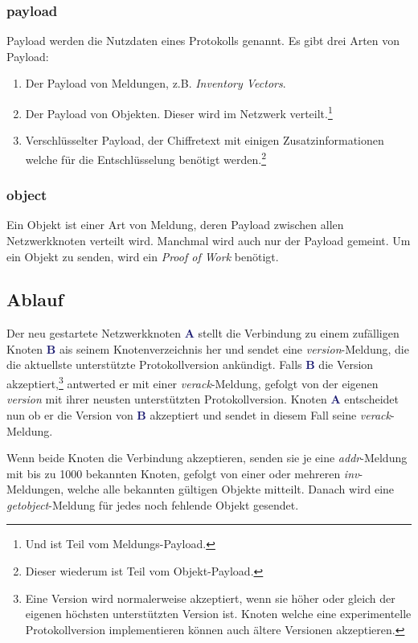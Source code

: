 \documentclass{bfh}
\newcommand{\msg}[1]{\textit{\textcolor{RedOrange}{#1}}}
\newcommand{\node}[1]{\textbf{\textcolor{MidnightBlue}{#1}}}
\begin{document}
  \subsubsection{payload}
  Payload werden die Nutzdaten eines Protokolls genannt. Es gibt drei Arten von Payload:
  \begin{enumerate}
  \item Der Payload von Meldungen, z.B. \textit{Inventory Vectors}.
  \item Der Payload von Objekten. Dieser wird im Netzwerk verteilt.\footnote{Und ist Teil vom Meldungs-Payload.}
  \item Verschlüsselter Payload, der Chiffretext mit einigen Zusatzinformationen welche für die Entschlüsselung benötigt werden.\footnote{Dieser wiederum ist Teil vom Objekt-Payload.}
  \end{enumerate}

  \subsubsection{object}
  Ein Objekt ist einer Art von Meldung, deren Payload zwischen allen Netzwerkknoten verteilt wird. Manchmal wird auch nur der Payload gemeint. Um ein Objekt zu senden, wird ein \textit{Proof of Work} benötigt.

  \subsection{Ablauf}

  Der neu gestartete Netzwerkknoten \node{A} stellt die Verbindung zu einem zufälligen Knoten \node{B} ais seinem Knotenverzeichnis her und sendet eine \msg{version}-Meldung, die die aktuellste unterstützte Protokollversion ankündigt. Falls \node{B} die Version akzeptiert,\footnote{Eine Version wird normalerweise akzeptiert, wenn sie höher oder gleich der eigenen höchsten unterstützten Version ist. Knoten welche eine experimentelle Protokollversion implementieren können auch ältere Versionen akzeptieren.} antwerted er mit einer \msg{verack}-Meldung, gefolgt von der eigenen \msg{version} mit ihrer neusten unterstützten Protokollversion. Knoten \node{A} entscheidet nun ob er die Version von \node{B} akzeptiert und sendet in diesem Fall seine \msg{verack}-Meldung.

  Wenn beide Knoten die Verbindung akzeptieren, senden sie je eine \msg{addr}-Meldung mit bis zu 1000 bekannten Knoten, gefolgt von einer oder mehreren \msg{inv}-Meldungen, welche alle bekannten gültigen Objekte mitteilt. Danach wird eine \msg{getobject}-Meldung für jedes noch fehlende Objekt gesendet.
\end{document}
